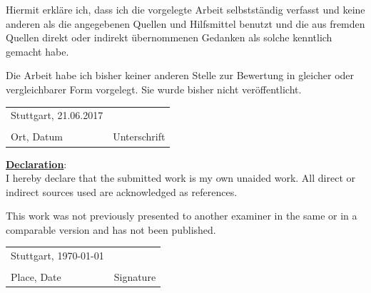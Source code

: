\documentclass[paper=a4, fontsize=11pt]{scrartcl} %
\numberwithin{equation}{section} %
\numberwithin{figure}{section} %
\numberwithin{table}{section} %
\begin{document}
\noindent Hiermit erkl\"{a}re ich, dass ich die vorgelegte Arbeit selbstst\"{a}ndig verfasst und keine anderen als die angegebenen Quellen und Hilfsmittel benutzt und die aus fremden Quellen direkt oder indirekt \"{u}bernommenen Gedanken als solche kenntlich gemacht habe.

\noindent Die Arbeit habe ich bisher keiner anderen Stelle zur Bewertung in gleicher oder vergleichbarer Form vorgelegt. Sie wurde bisher nicht ver\"{o}ffentlicht.

\vspace{40pt}
\noindent\begin{tabular}{ll}
	Stuttgart, 21.06.2017 & \\
	\makebox[2.5in]{\hrulefill} & \makebox[2.5in]{\hrulefill}\\
	Ort, Datum & Unterschrift\\[8ex]%
\end{tabular}

\noindent \textbf{\underline{Declaration}}:\\

\noindent I hereby declare that the submitted work is my own unaided work. All direct or indirect sources used are acknowledged as references.

\noindent This work was not previously presented to another examiner in the same or in a comparable version and has not been published.

\vspace{40pt}
\noindent\begin{tabular}{ll}
	Stuttgart, \today & \\
	\makebox[2.5in]{\hrulefill} & \makebox[2.5in]{\hrulefill}\\
	Place, Date & Signature\\[8ex]%
\end{tabular}
\end{document}
